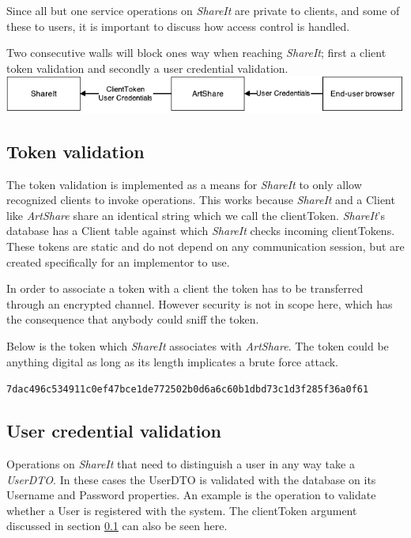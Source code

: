\documentclass[../report.tex]{subfiles}
\begin{document}
\graphicspath{{img/}{../img/}}


Since all but one service operations on \textit{ShareIt} are private to clients, and some of these to users, it is important to discuss how access control is handled.

Two consecutive walls will block ones way when reaching \textit{ShareIt}; first a client token validation and secondly a user credential validation. \\

\includegraphics[width=\linewidth]{./AccessControlDeployment.pdf}

\subsection{Token validation}
\label{sec:Token}

The token validation is implemented as a means for \textit{ShareIt} to only allow recognized clients to invoke operations. This works because \textit{ShareIt} and a Client like \textit{ArtShare} share an identical string which we call the clientToken. \textit{ShareIt}'s database has a Client table against which \textit{ShareIt} checks incoming clientTokens. These tokens are static and do not depend on any communication session, but are created specifically for an implementor to use.

In order to associate a token with a client the token has to be transferred through an encrypted channel. However security is not in scope here, which has the consequence that anybody could sniff the token.

Below is the token which \textit{ShareIt} associates with \textit{ArtShare}. The token could be anything digital as long as its length implicates a brute force attack.

\begin{center}
\texttt{7dac496c534911c0ef47bce1de772502b0d6a6c60b1dbd73c1d3f285f36a0f61}
\end{center}



\subsection{User credential validation}
\label{sec:UserCredential}

Operations on \textit{ShareIt} that need to distinguish a user in any way take a \textit{UserDTO}. In these cases the UserDTO is validated with the database on its Username and Password properties. An example is the operation to validate whether a User is registered with the system. The clientToken argument discussed in section \ref{sec:Token} can also be seen here. 
\end{document}
